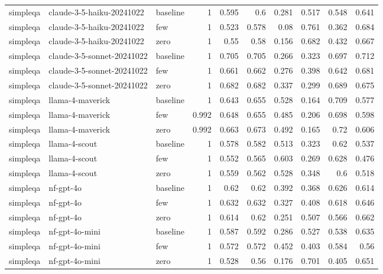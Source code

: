 \begin{table}[htbp]
\begin{tabular}{lllrrrrrrr}
simpleqa & claude-3-5-haiku-20241022 & baseline & 1 & 0.595 & 0.6 & 0.281 & 0.517 & 0.548 & 0.641 \\
simpleqa & claude-3-5-haiku-20241022 & few & 1 & 0.523 & 0.578 & 0.08 & 0.761 & 0.362 & 0.684 \\
simpleqa & claude-3-5-haiku-20241022 & zero & 1 & 0.55 & 0.58 & 0.156 & 0.682 & 0.432 & 0.667 \\
simpleqa & claude-3-5-sonnet-20241022 & baseline & 1 & 0.705 & 0.705 & 0.266 & 0.323 & 0.697 & 0.712 \\
simpleqa & claude-3-5-sonnet-20241022 & few & 1 & 0.661 & 0.662 & 0.276 & 0.398 & 0.642 & 0.681 \\
simpleqa & claude-3-5-sonnet-20241022 & zero & 1 & 0.682 & 0.682 & 0.337 & 0.299 & 0.689 & 0.675 \\
simpleqa & llama-4-maverick & baseline & 1 & 0.643 & 0.655 & 0.528 & 0.164 & 0.709 & 0.577 \\
simpleqa & llama-4-maverick & few & 0.992 & 0.648 & 0.655 & 0.485 & 0.206 & 0.698 & 0.598 \\
simpleqa & llama-4-maverick & zero & 0.992 & 0.663 & 0.673 & 0.492 & 0.165 & 0.72 & 0.606 \\
simpleqa & llama-4-scout & baseline & 1 & 0.578 & 0.582 & 0.513 & 0.323 & 0.62 & 0.537 \\
simpleqa & llama-4-scout & few & 1 & 0.552 & 0.565 & 0.603 & 0.269 & 0.628 & 0.476 \\
simpleqa & llama-4-scout & zero & 1 & 0.559 & 0.562 & 0.528 & 0.348 & 0.6 & 0.518 \\
simpleqa & nf-gpt-4o & baseline & 1 & 0.62 & 0.62 & 0.392 & 0.368 & 0.626 & 0.614 \\
simpleqa & nf-gpt-4o & few & 1 & 0.632 & 0.632 & 0.327 & 0.408 & 0.618 & 0.646 \\
simpleqa & nf-gpt-4o & zero & 1 & 0.614 & 0.62 & 0.251 & 0.507 & 0.566 & 0.662 \\
simpleqa & nf-gpt-4o-mini & baseline & 1 & 0.587 & 0.592 & 0.286 & 0.527 & 0.538 & 0.635 \\
simpleqa & nf-gpt-4o-mini & few & 1 & 0.572 & 0.572 & 0.452 & 0.403 & 0.584 & 0.56 \\
simpleqa & nf-gpt-4o-mini & zero & 1 & 0.528 & 0.56 & 0.176 & 0.701 & 0.405 & 0.651 \\
\bottomrule
\end{tabular}
\end{table}

